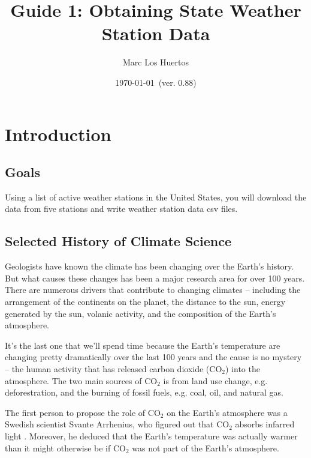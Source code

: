 \documentclass{article}\usepackage[]{graphicx}\usepackage[]{xcolor}
\title{Guide 1: Obtaining State Weather Station Data}
\author{Marc Los Huertos}
\date{\today~(ver. 0.88)}
\begin{document}
\maketitle

\section{Introduction}

\subsection{Goals}

Using a list of active weather stations in the United States, you  will download the data from five stations and write weather station data csv files. 


\subsection{Selected History of Climate Science}

Geologists have known the climate has been changing over the Earth's history. But what causes these changes has been a major research area for over 100 years. There are numerous drivers that contribute to changing climates -- including the arrangement of the continents on the planet, the distance to the sun, energy generated by the sun, volanic activity, and the composition of the Earth's atmosphere. 

It's the last one that we'll spend time because the Earth's temperature are changing pretty dramatically over the last 100 years and the cause is no mystery -- the human activity that has released carbon dioxide (CO$_2$) into the atmosphere. The two main sources of CO$_2$ is from land use change, e.g. deforestration, and the burning of fossil fuels, e.g. coal, oil, and natural gas. 

The first person to propose the role of CO$_2$ on the Earth's atmosphere was a Swedish scientist Svante Arrhenius, who figured out that CO$_2$ absorbs infarred light \citep{rodhe1997svante}. Moreover, he deduced that the Earth's temperature was actually warmer than it might otherwise be if CO$_2$ was not part of the Earth's atmosphere. 
\end{document}
